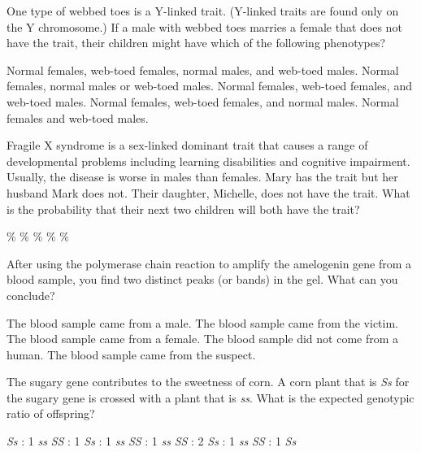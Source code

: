
\question
One type of webbed toes is a Y-linked trait. (Y-linked traits are found only on the Y chromosome.) If a male with webbed toes marries a female that does not have the trait, their children might have which of the following phenotypes?

\begin{choices}
\choice Normal females, web-toed females, normal males, and web-toed males.
\choice Normal females, normal males or web-toed males.
\choice Normal females, web-toed females, and web-toed males.
\choice Normal females, web-toed females, and normal males.
\correctchoice Normal females and web-toed males.
\end{choices}

\question
Fragile X syndrome is a sex-linked dominant trait that causes a range of developmental problems including learning disabilities and cognitive impairment.  Usually, the disease is worse in males than females.  Mary has the trait but her husband Mark does not. Their daughter, Michelle, does not have the trait. What is the probability that their next two children will both have the trait?

\begin{choices}
\%
\%
\%
\%
\%
\end{choices}

\question
After using the polymerase chain reaction to amplify the amelogenin gene from a blood sample, you find two distinct peaks (or bands) in the gel.  What can you conclude?

\begin{choices}
\correctchoice The blood sample came from a male.
\choice The blood sample came from the victim.
\choice The blood sample came from a female.
\choice The blood sample did not come from a human.
\choice The blood sample came from the suspect.
\end{choices}

\question
The sugary gene contributes to the sweetness of corn. A corn plant that is \textit{Ss} for the sugary gene is crossed with a plant that is \textit{ss}. What is the expected genotypic ratio of offspring?

\begin{choices}
 \textit{Ss} : 1 \textit{ss}
 \textit{SS} : 1 \textit{Ss} : 1 \textit{ss}
 \textit{SS} : 1 \textit{ss}
 \textit{SS} : 2 \textit{Ss} : 1 \textit{ss}
 \textit{SS} : 1 \textit{Ss}
\end{choices}

